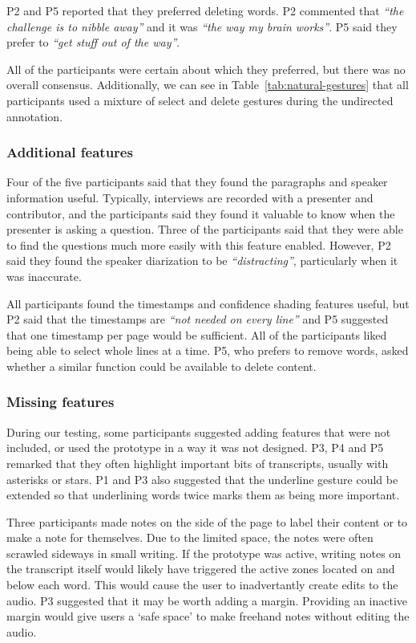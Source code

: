 P2 and P5 reported that they preferred deleting words. P2 commented that \textit{``the challenge is to nibble away''}
and it was \textit{``the way my brain works''}. P5 said they prefer to \textit{``get stuff out of the way''}.

All of the participants were certain about which they preferred, but there was no overall consensus. Additionally, we
can see in Table~\ref{tab:natural-gestures} that all participants used a mixture of select and delete gestures during
the undirected annotation.

\subsubsection{Additional features}

Four of the five participants said that they found the paragraphs and speaker information useful. Typically, interviews
are recorded with a presenter and contributor, and the participants said they found it valuable to know when the
presenter is asking a question. Three of the participants said that they were able to find the questions much more
easily with this feature enabled. However, P2 said they found the speaker diarization to be \textit{``distracting''},
particularly when it was inaccurate.

All participants found the timestamps and confidence shading features useful, but P2 said that the timestamps are
\textit{``not needed on every line''} and P5 suggested that one timestamp per page would be sufficient. All of the
participants liked being able to select whole lines at a time. P5, who prefers to remove words, asked whether a similar
function could be available to delete content.

\subsubsection{Missing features}

During our testing, some participants suggested adding features that were not included, or used the prototype in a
way it was not designed.
P3, P4 and P5 remarked that they often highlight important bits of transcripts, usually with asterisks or stars.
P1 and P3 also suggested that the underline gesture could be extended so that underlining words twice marks them as
being more important.

Three participants made notes on the side of the page to label their content or to make a note for themselves. Due to
the limited space, the notes were often scrawled sideways in small writing. If the prototype was active, writing notes
on the transcript itself would likely have triggered the active zones located on and below each word. This would cause
the user to inadvertantly create edits to the audio. P3 suggested that it may be worth adding a margin. Providing an
inactive margin would give users a `safe space' to make freehand notes without editing the audio.

